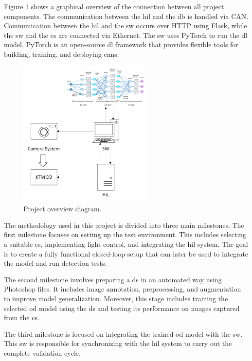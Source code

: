Figure \ref{proj_overview} shows a graphical overview of the connection between all project components. The communication between the \gls{hil} and the \gls{db} is handled via CAN. Communication between the \gls{hil} and the \gls{sw} occurs over HTTP using Flask, while the \gls{sw} and the \gls{cs} are connected via Ethernet. The \gls{sw} uses PyTorch to run the \gls{dl} model. PyTorch is an open-source \gls{dl} framework that provides flexible tools for building, training, and deploying \gls{cnn}s.

\begin{figure}[!htb]
    \centering
    \includegraphics[width=0.6\textwidth]{Figures/Project_overview.png}
    \caption{Project overview diagram.}
    \label{proj_overview}
\end{figure}

The methodology used in this project is divided into three main milestones. The first milestone focuses on setting up the test environment. This includes selecting a suitable \gls{cs}, implementing light control, and integrating the \gls{hil} system. The goal is to create a fully functional closed-loop setup that can later be used to integrate the model and run detection tests.

The second milestone involves preparing a \gls{ds} in an automated way using Photoshop files. It includes image annotation, preprocessing, and augmentation to improve model generalization. Moreover, this stage includes training the selected \gls{od} model using the \gls{ds} and testing its performance on images captured from the \gls{cs}.

The third milestone is focused on integrating the trained \gls{od} model with the \gls{sw}. This \gls{sw} is responsible for synchronizing with the \gls{hil} system to carry out the complete validation cycle.


